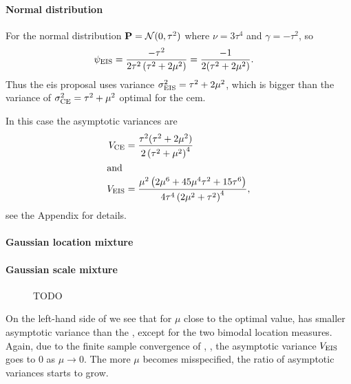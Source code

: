 \begin{example}
    \paragraph{Normal distribution}
    For the normal distribution $\P = \mathcal N (0, \tau^{2})$ where $\nu = 3 \tau^{4}$ and $\gamma = -\tau^{2}$, so 
    \begin{align*}
        \peis &= \frac{-\tau^{2}}{2\tau^{2} \left( \tau^{2} + 2\mu^{2} \right)} = \frac{-1}{2(\tau^{2} + 2\mu^{2})}.
    \end{align*}
    Thus the \gls{eis} proposal uses variance $\sigma^{2}_{\eis} = \tau^{2} + 2\mu^{2}$, which is bigger than the variance of $\sigma^{2}_{\ce} = \tau^{2} + \mu^{2}$ optimal for the \gls{cem}.

    In this case the asymptotic variances are
    \begin{align*}
        V_{\ce} &= \frac{\tau^{2}(\tau^{2} + 2\mu^{2})}{2 \left( \tau^{2} + \mu^{2} \right)^{4}}\\
        \intertext{and}
        V_{\eis} &= \frac{\mu^{2} \left(2 \mu^{6} + 45 \mu^{4} \tau^{2} + 15 \tau^{6}\right)}{4 \tau^{4} \left(2 \mu^{2} + \tau^{2}\right)^{4}},
    \end{align*}
    see the Appendix for details. 

    \paragraph{Gaussian location mixture}


    \paragraph{Gaussian scale mixture}

\end{example}
\begin{figure}
    \centering

    \resizebox{\textwidth}{!}{%
    }
    \caption{{\color{red} TODO}}
    \label{fig:cem_eis_sigma2}
\end{figure}

On the left-hand side of  we see that for $\mu$ close to the optimal value, \aeis has smaller asymptotic variance than the \acem, except for the two bimodal location measures. Again, due to the finite sample convergence of \aeis, , the asymptotic variance $V_{\eis}$ goes to $0$ as $\mu \to 0$. The more $\mu$ becomes misspecified, the ratio of asymptotic variances starts to grow. 

